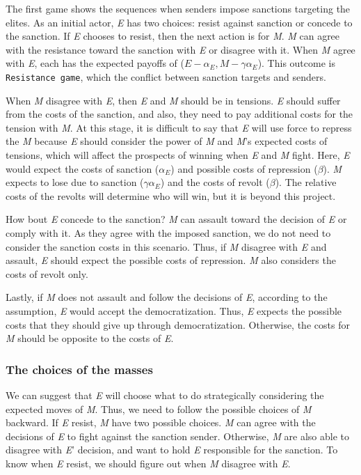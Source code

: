 \documentclass[11pt, letterpage]{article}
\begin{document}
The first game shows the sequences when senders impose sanctions targeting the elites. As an initial actor, \textit{E} has two choices: resist against sanction or concede to the sanction. If \textit{E} chooses to resist, then the next action is for \textit{M}. \textit{M} can agree with the resistance toward the sanction with \textit{E} or disagree with it. When \textit{M} agree with \textit{E}, each has the expected payoffs of ($E-\alpha_E, M-\gamma\alpha_{E}$). This outcome is \texttt{Resistance game}, which the conflict between sanction targets and senders.
	
When \textit{M} disagree with \textit{E}, then \textit{E} and \textit{M} should be in tensions. \textit{E} should suffer from the costs of the sanction, and also, they need to pay additional costs for the tension with \textit{M}. At this stage, it is difficult to say that \textit{E} will use force to repress the \textit{M} because \textit{E} should consider the power of \textit{M} and \textit{M}'s expected costs of tensions, which will affect the prospects of winning when \textit{E} and \textit{M} fight. Here, \textit{E} would expect the costs of sanction ($\alpha_{E}$) and possible costs of repression ($\beta$). \textit{M} expects to lose due to sanction ($\gamma\alpha_{E}$) and the costs of revolt ($\beta$). The relative costs of the revolts will determine who will win, but it is beyond this project.
	
How bout \textit{E} concede to the sanction? \textit{M} can assault toward the decision of \textit{E} or comply with it. As they agree with the imposed sanction, we do not need to consider the sanction costs in this scenario. Thus, if \textit{M} disagree with \textit{E} and assault, \textit{E} should expect the possible costs of repression. \textit{M} also considers the costs of revolt only.
	
Lastly, if \textit{M} does not assault and follow the decisions of \textit{E}, according to the assumption, \textit{E} would accept the democratization. Thus, \textit{E} expects the possible costs that they should give up through democratization. Otherwise, the costs for \textit{M} should be opposite to the costs of \textit{E}.
	
\subsubsection*{The choices of the masses}

We can suggest that \textit{E} will choose what to do strategically considering the expected moves of \textit{M}. Thus, we need to follow the possible choices of \textit{M} backward. If \textit{E} resist, \textit{M} have two possible choices. \textit{M} can agree with the decisions of \textit{E} to fight against the sanction sender. Otherwise,  \textit{M} are also able to disagree with \textit{E}' decision, and want to hold \textit{E} responsible for the sanction. To know when \textit{E} resist, we should figure out when \textit{M} disagree with \textit{E}.
	
\end{document}
